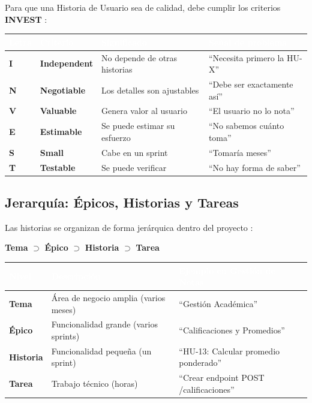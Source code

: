 \documentclass[12pt, a4paper]{article}
\begin{document}
Para que una Historia de Usuario sea de calidad, debe cumplir los criterios
\textbf{INVEST} \parencite{cohn2004}:

\vspace{0.3cm}
\begin{tabular}{>{\bfseries\centering\arraybackslash}p{1.1cm} >{\bfseries}p{3cm} p{5cm} p{3.5cm}}
  \toprule
  \rowcolor{espeazul}
  \textcolor{white}{Letra} & \textcolor{white}{Criterio} &
  \textcolor{white}{Significado} & \textcolor{white}{Señal de problema} \\
  \midrule
  I & Independent & No depende de otras historias & ``Necesita primero la HU-X'' \\
  N & Negotiable  & Los detalles son ajustables   & ``Debe ser exactamente así'' \\
  V & Valuable    & Genera valor al usuario       & ``El usuario no lo nota'' \\
  E & Estimable   & Se puede estimar su esfuerzo  & ``No sabemos cuánto toma'' \\
  S & Small       & Cabe en un sprint             & ``Tomaría meses'' \\
  T & Testable    & Se puede verificar            & ``No hay forma de saber'' \\
  \bottomrule
\end{tabular}

\subsection{Jerarquía: Épicos, Historias y Tareas}

Las historias se organizan de forma jerárquica dentro del proyecto
\parencite{schwaber2020}:

\begin{center}
  \textbf{Tema} $\supset$ \textbf{Épico} $\supset$ \textbf{Historia} $\supset$ \textbf{Tarea}
\end{center}

\vspace{0.3cm}
\begin{tabular}{>{\bfseries}p{2cm} p{5cm} p{5.5cm}}
  \toprule
  \rowcolor{espeazul}
  \textcolor{white}{Nivel} & \textcolor{white}{Descripción} & \textcolor{white}{Ejemplo en Gestión de Notas} \\
  \midrule
  Tema    & Área de negocio amplia (varios meses)     & ``Gestión Académica'' \\
  Épico   & Funcionalidad grande (varios sprints)     & ``Calificaciones y Promedios'' \\
  Historia & Funcionalidad pequeña (un sprint)         & ``HU-13: Calcular promedio ponderado'' \\
  Tarea   & Trabajo técnico (horas)                  & ``Crear endpoint POST /calificaciones'' \\
  \bottomrule
\end{tabular}
\end{document}
